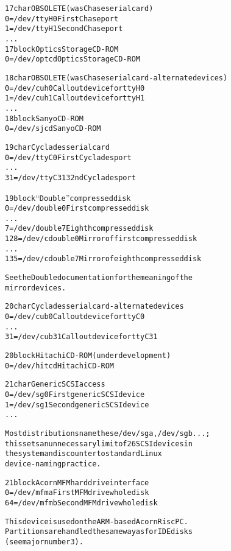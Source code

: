 \documentclass[a4paper,8pt,english]{sphinxmanual}
\begin{document}
\begin{alltt}
  17 char       OBSOLETE (was Chase serial card)
                  0 = /dev/ttyH0        First Chase port
                  1 = /dev/ttyH1        Second Chase port
                    ...
  17 block      Optics Storage CD-ROM
                  0 = /dev/optcd        Optics Storage CD-ROM

  18 char       OBSOLETE (was Chase serial card - alternate devices)
                  0 = /dev/cuh0         Callout device for ttyH0
                  1 = /dev/cuh1         Callout device for ttyH1
                    ...
  18 block      Sanyo CD-ROM
                  0 = /dev/sjcd         Sanyo CD-ROM

  19 char       Cyclades serial card
                  0 = /dev/ttyC0        First Cyclades port
                    ...
                 31 = /dev/ttyC31       32nd Cyclades port

  19 block      ``Double'' compressed disk
                  0 = /dev/double0      First compressed disk
                    ...
                  7 = /dev/double7      Eighth compressed disk
                128 = /dev/cdouble0     Mirror of first compressed disk
                    ...
                135 = /dev/cdouble7     Mirror of eighth compressed disk

                See the Double documentation for the meaning of the
                mirror devices.

  20 char       Cyclades serial card - alternate devices
                  0 = /dev/cub0         Callout device for ttyC0
                    ...
                 31 = /dev/cub31        Callout device for ttyC31

  20 block      Hitachi CD-ROM (under development)
                  0 = /dev/hitcd        Hitachi CD-ROM

  21 char       Generic SCSI access
                  0 = /dev/sg0          First generic SCSI device
                  1 = /dev/sg1          Second generic SCSI device
                    ...

                Most distributions name these /dev/sga, /dev/sgb...;
                this sets an unnecessary limit of 26 SCSI devices in
                the system and is counter to standard Linux
                device-naming practice.

  21 block      Acorn MFM hard drive interface
                  0 = /dev/mfma         First MFM drive whole disk
                 64 = /dev/mfmb         Second MFM drive whole disk

                This device is used on the ARM-based Acorn RiscPC.
                Partitions are handled the same way as for IDE disks
                (see major number 3).


\end{alltt}
\end{document}
